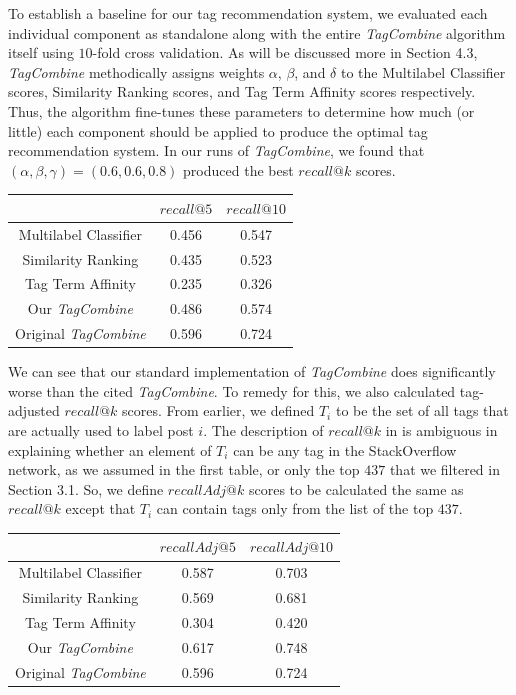 \documentclass[11pt]{IEEEtran}
\begin{document}
To establish a baseline for our tag recommendation system, we evaluated each individual component as standalone along with the entire \textit{TagCombine} algorithm itself using $10$-fold cross validation. As will be discussed more in Section 4.3, \textit{TagCombine} methodically assigns weights $\alpha$, $\beta$, and $\delta$ to the Multilabel Classifier scores, Similarity Ranking scores, and Tag Term Affinity scores respectively. Thus, the algorithm fine-tunes these parameters to determine how much (or little) each component should be applied to produce the optimal tag recommendation system. In our runs of \textit{TagCombine}, we found that $(\alpha, \beta, \gamma) = (0.6, 0.6, 0.8)$ produced the best $recall@k$ scores.

\begin{center}\begin{tabular}{c||c|c}
& $recall@5$ & $recall@10$\\ \hline\hline
Multilabel Classifier & 0.456 & 0.547\\ \hline
Similarity Ranking & 0.435 & 0.523\\ \hline
Tag Term Affinity & 0.235 & 0.326\\ \hline\hline
Our \textit{TagCombine} & 0.486 & 0.574\\ \hline\hline
\cite{1} Original \textit{TagCombine} & 0.596 & 0.724\\
\end{tabular}\end{center}

We can see that our standard implementation of \textit{TagCombine} does significantly worse than the cited \textit{TagCombine}. To remedy for this, we also calculated tag-adjusted $recall@k$ scores. From earlier, we defined $T_i$ to be the set of all tags that are actually used to label post $i$. The description of $recall@k$ in \cite{1} is ambiguous in explaining whether an element of $T_i$ can be any tag in the StackOverflow network, as we assumed in the first table, or only the top $437$ that we filtered in Section 3.1. So, we define $recallAdj@k$ scores to be calculated the same as $recall@k$ except that $T_i$ can contain tags only from the list of the top $437$.

\begin{center}\begin{tabular}{c||c|c}
& $recallAdj@5$ & $recallAdj@10$\\ \hline\hline
Multilabel Classifier & 0.587 & 0.703\\ \hline
Similarity Ranking & 0.569 & 0.681\\ \hline
Tag Term Affinity & 0.304 & 0.420\\ \hline\hline
Our \textit{TagCombine} & 0.617 & 0.748\\ \hline\hline
\cite{1} Original \textit{TagCombine} & 0.596 & 0.724\\
\end{tabular}\end{center}
\end{document}
